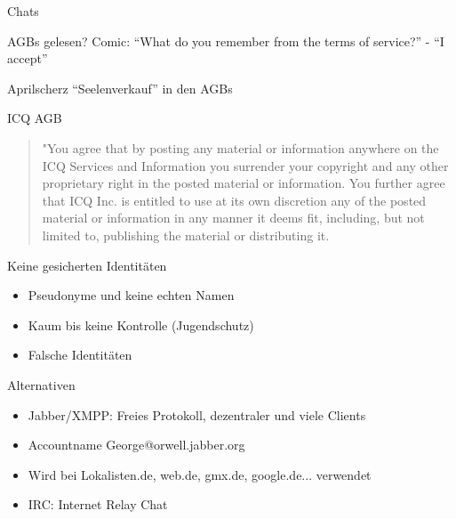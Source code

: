 \begin{frame}{Chats}
\end{frame}

\begin{frame}{AGBs gelesen?}
Comic: "`What do you remember from the terms of service?"' - "`I accept"'

Aprilscherz "`Seelenverkauf"' in den AGBs
\end{frame}
\begin{frame}{ICQ AGB}
	\begin{quotation}
		"You agree that by posting any material or information anywhere on the ICQ Services 
		and Information you surrender your copyright and any other proprietary right in the
		posted material or information. You further agree that ICQ Inc. is entitled to use at 
		its own discretion any of the posted material or information in any manner it deems fit, 
		including, but not limited to, publishing the material or distributing it.
	\end{quotation}

\end{frame}

\begin{frame}{Keine gesicherten Identitäten}
	\begin{itemize}
		\item Pseudonyme und keine echten Namen
		\item Kaum bis keine Kontrolle (Jugendschutz)
		\item Falsche Identit\"aten
	\end{itemize}
\end{frame}

\begin{frame}{Alternativen}
	\begin{itemize}
		\item Jabber/XMPP: Freies Protokoll, dezentraler und viele Clients
		\item Accountname George@orwell.jabber.org
		\item Wird bei Lokalisten.de, web.de, gmx.de, google.de... verwendet
		\item IRC: Internet Relay Chat
	\end{itemize}
\end{frame}

